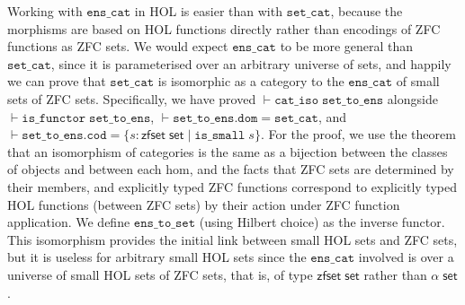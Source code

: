 \documentclass[twoside,titlepage,11pt]{article}
\begin{document}
Working with $\mathtt{ens\_cat}$ in HOL is easier than with $\mathtt{set\_cat}$, because the morphisms are based on HOL functions directly rather than encodings of ZFC functions as ZFC sets.
We would expect $\mathtt{ens\_cat}$ to be more general than $\mathtt{set\_cat}$, since it is parameterised over an arbitrary universe of sets, and happily we can prove that $\mathtt{set\_cat}$ is isomorphic as a category to the $\mathtt{ens\_cat}$ of small sets of ZFC sets.
Specifically, we have proved $\vdash\mathtt{cat\_iso}\;\mathtt{set\_to\_ens}$ alongside $\vdash\mathtt{is\_functor}\;\mathtt{set\_to\_ens}$, $\vdash\mathtt{set\_to\_ens}.\mathtt{dom}=\mathtt{set\_cat}$, and $\vdash\mathtt{set\_to\_ens}.\mathtt{cod}=\{s:\mathsf{zfset}\;\mathsf{set}\mid\mathtt{is\_small}\;s\}$.
For the proof, we use the theorem that an isomorphism of categories is the same as a bijection between the classes of objects and between each hom, and the facts that ZFC sets are determined by their members, and explicitly typed ZFC functions correspond to explicitly typed HOL functions (between ZFC sets) by their action under ZFC function application.
We define $\mathtt{ens\_to\_set}$ (using Hilbert choice) as the inverse functor.
This isomorphism provides the initial link between small HOL sets and ZFC sets, but it is useless for arbitrary small HOL sets since the $\mathtt{ens\_cat}$ involved is over a universe of small HOL sets of ZFC sets, that is, of type $\mathsf{zfset}\;\mathsf{set}$ rather than $\alpha\;\mathsf{set}$.
\end{document}
